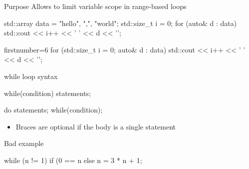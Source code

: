 \begin{frame}[fragile]
  \begin{block}{Purpose}
    Allows to limit variable scope in range-based loops
  \end{block}
  \begin{alertblock}{}
    \begin{cppcode*}{}
      std::array data = {"hello", ",", "world"};
      std::size_t i = 0;
      for (auto& d : data) {
        std::cout << i++ << ' ' << d << '\n';
      }
    \end{cppcode*}
  \end{alertblock}
  \begin{exampleblock}{}
    \begin{cppcode*}{firstnumber=6}
      for (std::size_t i = 0; auto& d : data) {
        std::cout << i++ << ' ' << d << '\n';
      }
    \end{cppcode*}
  \end{exampleblock}
\end{frame}

\begin{frame}[fragile]
  \begin{block}{while loop syntax}
    \begin{cppcode*}{}
      while(condition) {
        statements;
      }

      do {
        statements;
      } while(condition);
    \end{cppcode*}
    \begin{itemize}
      \item Braces are optional if the body is a single statement
    \end{itemize}
  \end{block}
  \pause
  \begin{alertblock}{Bad example}
    \begin{cppcode*}{}
      while (n != 1)
        if (0 == n%
        else n = 3 * n + 1;
    \end{cppcode*}
  \end{alertblock}
\end{frame}

